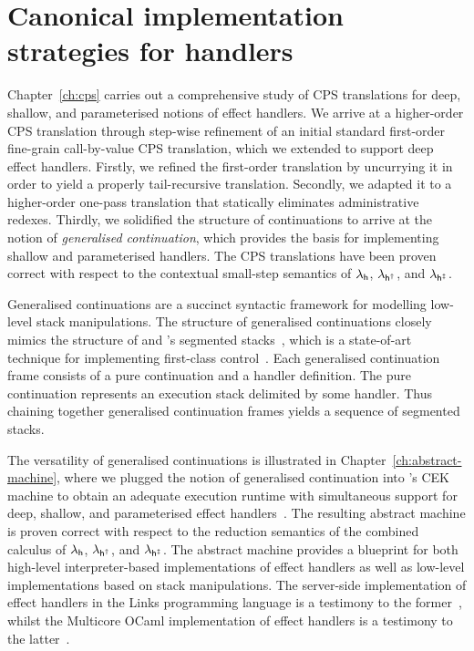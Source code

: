 \documentclass[12pt,phd,lfcs,twoside,openright,logo,leftchapter,normalheadings]{infthesis}
\theoremstyle{plain}
\theoremstyle{definition}
\begin{document}
\section{Canonical implementation strategies for handlers}
Chapter~\ref{ch:cps} carries out a comprehensive study of CPS
translations for deep, shallow, and parameterised notions of effect
handlers.
%
We arrive at a higher-order CPS translation through step-wise
refinement of an initial standard first-order fine-grain call-by-value
CPS translation, which we extended to support deep effect
handlers. Firstly, we refined the first-order translation by
uncurrying it in order to yield a properly tail-recursive
translation. Secondly, we adapted it to a higher-order one-pass
translation that statically eliminates administrative
redexes. Thirdly, we solidified the structure of continuations to
arrive at the notion of \emph{generalised continuation}, which
provides the basis for implementing shallow and parameterised
handlers.
%
The CPS translations have been proven correct with respect to the
contextual small-step semantics of $\lambda_{\mathsf{h}}$, $\lambda_{\mathsf{h^\dagger}}$, and $\lambda_{\mathsf{h^{\ddagger}}}$.

Generalised continuations are a succinct syntactic framework for
modelling low-level stack manipulations. The structure of generalised
continuations closely mimics the structure of \citeauthor{HiebDB90}
and \citeauthor{BruggemanWD96}'s segmented
stacks~\cite{HiebDB90,BruggemanWD96}, which is a state-of-art
technique for implementing first-class
control~\cite{FlattDDKMSTZ19}. Each generalised continuation frame
consists of a pure continuation and a handler definition. The pure
continuation represents an execution stack delimited by some
handler. Thus chaining together generalised continuation frames yields
a sequence of segmented stacks.

The versatility of generalised continuations is illustrated in
Chapter~\ref{ch:abstract-machine}, where we plugged the notion of
generalised continuation into \citeauthor{FelleisenF86}'s CEK machine
to obtain an adequate execution runtime with simultaneous support for
deep, shallow, and parameterised effect
handlers~\cite{FelleisenF86}. The resulting abstract machine is proven
correct with respect to the reduction semantics of the combined
calculus of $\lambda_{\mathsf{h}}$, $\lambda_{\mathsf{h^\dagger}}$, and $\lambda_{\mathsf{h^{\ddagger}}}$. The abstract machine
provides a blueprint for both high-level interpreter-based
implementations of effect handlers as well as low-level
implementations based on stack manipulations. The server-side
implementation of effect handlers in the Links programming language is
a testimony to the former~\cite{HillerstromL16}, whilst the Multicore
OCaml implementation of effect handlers is a testimony to the
latter~\cite{SivaramakrishnanDWKJM21}.
\end{document}
